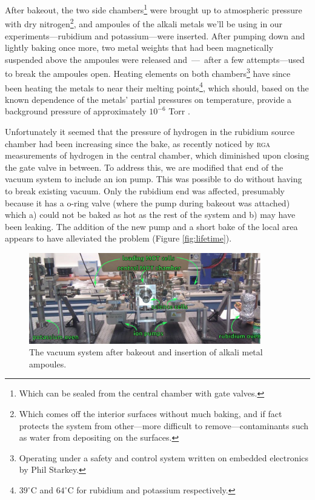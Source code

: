 After bakeout, the two side chambers\footnote{Which can be sealed from the central chamber with gate valves.} were brought up to atmospheric pressure with dry nitrogen\footnote{Which comes off the interior surfaces without much baking, and if fact protects the system from other---more difficult to remove---contaminants such as water from depositing on the surfaces.}, and ampoules of the alkali metals we'll be using in our experiments---rubidium and potassium---were inserted. After pumping down and lightly baking once more, two metal weights that had been magnetically suspended above the ampoules were released and~---~after a few attempts---used to break the ampoules open. Heating elements on both chambers\footnote{Operating under a safety and control system written on embedded electronics by Phil Starkey.} have since been heating the metals to near their melting points\footnote{$39^\circ$C and $64^\circ$C for rubidium and potassium respectively.}, which should, based on the known dependence of the metals' partial pressures on temperature, provide a background pressure of approximately $10^{-6}$ Torr \cite{steck_rubidium_2010, tiecke_properties_2011}.

Unfortunately it seemed that the pressure of hydrogen in the rubidium source chamber had been increasing since the bake, as recently noticed by \textsc{rga} measurements of hydrogen in the central chamber, which diminished upon closing the gate valve in between. To address this, we are modified that end of the vacuum system to include an ion pump. This was possible to do without having to break existing vacuum. Only the rubidium end was affected, presumably because it has a o-ring valve (where the pump during bakeout was attached) which a) could not be baked as hot as the rest of the system and b) may have been leaking. The addition of the new pump and a short bake of the local area appears to have alleviated the problem (Figure \ref{fig:lifetime}).

\begin{figure}
\begin{center}
\includegraphics[width=0.9\textwidth]{figures/unsorted/vacsystem.png}
\caption{\label{fig:vacsystem}The vacuum system after bakeout and insertion of alkali metal ampoules.}
\end{center}
\end{figure}

